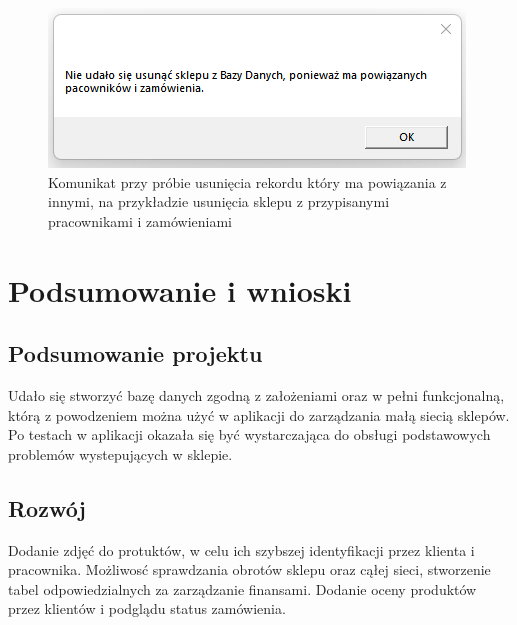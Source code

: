 \documentclass[12pt,a4paper]{article}
\begin{document}
            \begin{figure}[H]
                \centering
                \includegraphics{images/komunikat2.png}
                \caption{Komunikat przy próbie usunięcia rekordu który ma powiązania z innymi, na przykładzie usunięcia sklepu z przypisanymi pracownikami i zamówieniami}
            \end{figure}
            
    \section{Podsumowanie i wnioski}
        \subsection{Podsumowanie projektu}
            Udało się stworzyć bazę danych zgodną z założeniami oraz w pełni funkcjonalną, którą z powodzeniem można użyć w aplikacji do zarządzania małą siecią sklepów. Po testach w aplikacji okazała się być wystarczająca do obsługi podstawowych problemów wystepujących w sklepie.
            
        \subsection{Rozwój}
            Dodanie zdjęć do protuktów, w celu ich szybszej identyfikacji przez klienta i pracownika. Możliwosć sprawdzania obrotów sklepu oraz cąłej sieci, stworzenie tabel odpowiedzialnych za zarządzanie finansami. Dodanie oceny produktów przez klientów i podglądu status zamówienia.
    
\end{document}
